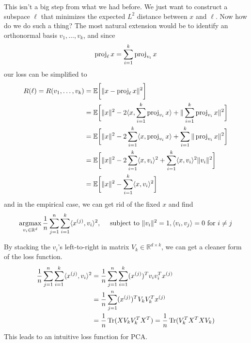   This isn't a big step from what we had before. We just want to construct a subspace $\ell$ that minimizes the expected $L^2$ distance between $x$ and $\ell$. Now how do we do such a thing? The most natural extension would be to identify an orthonormal basis $v_1, \ldots, v_k$, and since 
  \begin{equation}
    \operatorname{proj}_\ell x = \sum_{i=1}^k \operatorname{proj}_{v_i} x
  \end{equation} 
  our loss can be simplified to 
  \begin{align}
    R(\ell) = R(v_1, \ldots, v_k) 
    & = \mathbb{E} \bigg[ \| x - \operatorname{proj}_\ell x \|^2 \bigg] \\ 
    & = \mathbb{E} \bigg[ \|x\|^2 - 2 \langle x, \sum_{i=1}^k \operatorname{proj}_{v_i} x \rangle + \| \sum_{i=1}^k \operatorname{proj}_{v_i} x \|^2 \bigg] \\ 
    & = \mathbb{E} \bigg[ \|x\|^2 - 2 \sum_{i=1}^k \langle x, \operatorname{proj}_{v_i} x \rangle + \sum_{i=1}^k \| \operatorname{proj}_{v_i} x \|^2 \bigg] \\
    & = \mathbb{E} \bigg[ \|x\|^2 - 2 \sum_{i=1}^k \langle x, v_i \rangle^2 + \sum_{i=1}^k \langle x, v_i \rangle^2 \|v_i\|^2 \bigg] \\ 
    & = \mathbb{E} \bigg[ \|x\|^2 - \sum_{i=1}^k \langle x, v_i \rangle^2 \bigg] 
  \end{align} 
  and in the empirical case, we can get rid of the fixed $x$ and find 
  \begin{equation}
    \operatorname*{\arg\!\max}_{v_i \in \mathbb{R}^d} \frac{1}{n} \sum_{j=1}^n \sum_{i=1}^k \langle x^{(j)}, v_i \rangle^2, \quad \text{ subject to } \|v_i\|^2 = 1, \langle v_i, v_j \rangle = 0 \text{ for } i \neq j
  \end{equation} 

  By stacking the $v_i$'s left-to-right in matrix $V_k \in \mathbb{R}^{d \times k}$, we can get a cleaner form of the loss function. 
  \begin{align}
    \frac{1}{n} \sum_{j=1}^n \sum_{i=1}^k \langle x^{(j)}, v_i \rangle^2 
    & = \frac{1}{n} \sum_{j=1}^n \sum_{i=1}^k (x^{(j)})^T v_i v_i^T x^{(j)} \\ 
    & = \frac{1}{n} \sum_{j=1}^n (x^{(j)})^T V_k V_k^T x^{(j)} \\ 
    & = \frac{1}{n} \operatorname{Tr}(X V_k V_k^T X^T) = \frac{1}{n} \operatorname{Tr}(V_k^T X^T  X V_k) \label{trace}
  \end{align}
  This leads to an intuitive loss function for PCA. 

